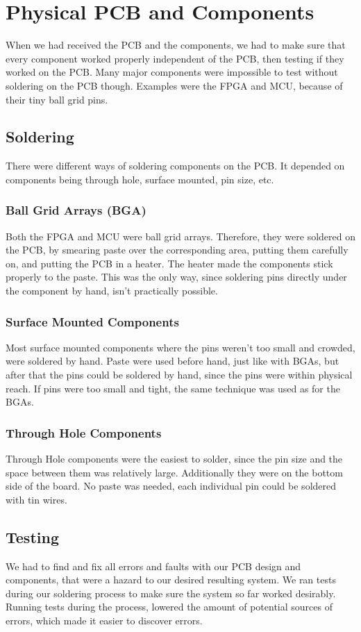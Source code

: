 \section{Physical PCB and Components}
When we had received the PCB and the components, we had to make sure that every component worked properly independent of the PCB, then testing if they worked on the PCB. Many major components were impossible to test without soldering on the PCB though. Examples were the FPGA and MCU, because of their tiny ball grid pins.

\subsection{Soldering}
There were different ways of soldering components on the PCB. It depended on components being through hole, surface mounted, pin size, etc.
\subsubsection{Ball Grid Arrays (BGA)}
Both the FPGA and MCU were ball grid arrays.
Therefore, they were soldered on the PCB, by smearing paste over the corresponding area, putting them carefully on, and putting the PCB in a heater. The heater made the components stick properly to the paste. This was the only way, since soldering pins directly under the component by hand, isn't practically possible.

\subsubsection{Surface Mounted Components}
Most surface mounted components where the pins weren't too small and crowded, were soldered by hand. Paste were used before hand, just like with BGAs, but after that the pins could be soldered by hand, since the pins were within physical reach. 
\newline
If pins were too small and tight, the same technique was used as for the BGAs.

\subsubsection{Through Hole Components}
Through Hole components were the easiest to solder, since the pin size and the space between them was relatively large. Additionally they were on the bottom side of the board. No paste was needed, each individual pin could be soldered with tin wires.

\subsection{Testing}
We had to find and fix all errors and faults with our PCB design and components, that were a hazard to our desired resulting system.  
We ran tests during our soldering process to make sure the system so far worked desirably. Running tests during the process, lowered the amount of potential sources of errors, which made it easier to discover errors.

